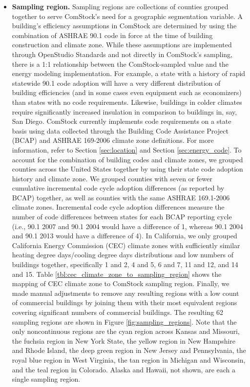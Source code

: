 \begin{itemize}
  \item \textbf{Sampling region.} Sampling regions are collections of counties grouped together to serve ComStock’s need for a geographic segmentation variable. A building’s efficiency assumptions in ComStock are determined by using the combination of ASHRAE 90.1 code in force at the time of building construction and climate zone. While these assumptions are implemented through OpenStudio Standards and not directly in ComStock's sampling, there is a 1:1 relationship between the ComStock-sampled value and the energy modeling implementation. For example, a state with a history of rapid statewide 90.1 code adoption will have a very different distribution of building efficiencies (and in some cases even equipment such as economizers) than states with no code requirements. Likewise, buildings in colder climates require significantly increased insulation in comparison to buildings in, say, San Diego. ComStock currently implements code requirements on a state basis using data collected through the Building Code Assistance Project (BCAP) and ASHRAE 169-2006 climate zone definitions. For more information, refer to Section \ref{sec:location} and Section \ref{sec:energy_code}. To account for the combination of building codes and climate zones, we grouped counties across the United States together by using their state code adoption history and climate zone. We grouped counties with seven or fewer cumulative incremental code cycle adoption differences (as reported by BCAP) together, as well as counties with the same ASHRAE 169.1-2006 climate zones. Incremental code cycle adoption differences measure the number of code differences between states for each BCAP reporting cycle (i.e., 90.1 2007 and 90.1 2004 would have a difference of 1, whereas 90.1 2004 and 90.1 2013 would have a difference of 4). In California, we only grouped California Energy Commission (CEC) climate zones with sufficiently similar heating degree days/cooling degree days distributions and low numbers of buildings together, specifically 1 and 2, 4 and 5, 6 and 7, 11 and 12, and 14 and 15. Table \ref{tbl:cec_climate_zone_to_sampling_region} shows the mapping of CEC climate zone to ComStock sampling region. Finally, we made manual adjustments to remove any resulting regions with a low count of commercial buildings by joining them with their most equivalent regions covering significant numbers of commercial buildings. The resulting 62 sampling regions are shown in Figure \ref{fig:sampling_regions}. Note that the only noncontinuous regions are the cyan region across Kansas and Missouri, the fuchsia region in New York State, the yellow region in New Hampshire and Rhode Island, the deep green region in New Jersey and Pennsylvania, the royal blue region in West Virginia, the tan region in Michigan and Wisconsin, and the teal region in Colorado. Alaska and Hawaii, not shown, are each a single sampling region.
\end{itemize}


